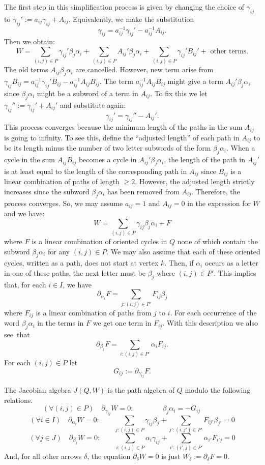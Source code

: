 The first step in this simplification process is given by changing the choice of $\gamma_{ij}$ to $\gamma_{ij}':=a_{ij}\gamma_{ij}+A_{ij}$. Equivalently, we make the substitution 
\[
\gamma_{ij}=a_{ij}^{-1}\gamma_{ij}'-a_{ij}^{-1}A_{ij}.
\]
Then we obtain:
\[
	W=\sum_{(i,j)\in P}\gamma_{ij}'\beta_j\alpha_i+\sum_{(i,j)\in P}A_{ij}'\beta_j\alpha_i+\sum_{(i,j)\in P}\gamma_{ij}'B_{ij}'+ \text{ other terms}.
\]
The old terms $A_{ij}\beta_j\alpha_i$ are cancelled. However, new term arise from $\gamma_{ij}B_{ij}=a_{ij}^{-1}\gamma_{ij}'B_{ij}-a_{ij}^{-1}A_{ij}B_{ij}$. The term $a_{ij}^{-1}A_{ij}B_{ij}$ might give a term $A_{ij}'\beta_j\alpha_i$ since $\beta_j\alpha_i$ might be a subword of a term in $A_{ij}$. To fix this we let $\gamma_{ij}'':=\gamma_{ij}'+A_{ij}'$ and substitute again:
\[
	\gamma_{ij}'=\gamma_{ij}''-A_{ij}'.
\]
This process converges because the minimum length of the paths in the sum $A_{ij}$ is going to infinity. To see this, define the ``adjusted length'' of each path in $A_{ij}$ to be its length minus the number of two letter subwords of the form $\beta_j\alpha_i$. When a cycle in the sum $A_{ij}B_{ij}$ becomes a cycle in $A_{ij}'\beta_j\alpha_i$, the length of the path in $A_{ij}'$ is at least equal to the length of the corresponding path in $A_{ij}$ since $B_{ij}$ is a linear combination of paths of length $\ge2$. However, the adjusted length strictly increases since the subword $\beta_j\alpha_i$ has been removed from $A_{ij}$. Therefore, the process converges. So, we may assume $a_{ij}=1$ and $A_{ij}=0$ in the expression for $W$ and we have:
\[
	W=\sum_{(i,j)\in P}\gamma_{ij}\beta_j\alpha_i+F
\]
where $F$ is a linear combination of oriented cycles in $Q$ none of which contain the subword $\beta_j\alpha_i$ for any $(i,j)\in P$. We may also assume that each of these oriented cycles, written as a path, does not start at vertex $k$. Then, if $\alpha_i$ occurs as a letter in one of these paths, the next letter must be $\beta_{j}$ where $(i,j)\in P'$. This implies that, for each $i\in I$, we have
\[
	\partial_{\alpha_i}F=\sum_{j:(i,j)\in P'} F_{ij}\beta_j
\]
where $F_{ij}$ is a linear combination of paths from $j$ to $i$. For each occurrence of the word $\beta_j\alpha_i$ in the terms in $F$ we get one term in $F_{ij}$. With this description we also see~that
\[
	\partial_{\beta_j}F=\sum_{i:(i,j)\in P'} \alpha_iF_{ij}.
\]
For each $(i,j)\in P$ let
\[
	G_{ij}:=\partial_{\gamma_{ij}}F.
\]


The Jacobian algebra $J(Q,W)$ is the path algebra of $Q$ modulo the following relations.
\[
	(\forall (i,j)\in P)\quad \partial_{\gamma_{ij}}W=0:\qquad\qquad \beta_j\alpha_i=-G_{ij}\qquad\quad 
\]
\begin{equation}\label{partial alpha-i W=0}
	(\forall i\in I)\quad \partial_{\alpha_i}W=0:\qquad \sum_{j:(i,j)\in P} \gamma_{ij}\beta_j+\sum_{j':(i,j')\in P'} F_{ij'}\beta_{j'} =0
\end{equation}
\[
	(\forall j\in J)\quad \partial_{\beta_j}W=0:\qquad \sum_{i: (i,j)\in P} \alpha_i\gamma_{ij}+\sum_{i': (i',j)\in P'} \alpha_{i'}F_{i'j} =0
\]
And, for all other arrows $\delta$, the equation $\partial_\delta W=0$ is just $W_\delta:=\partial_\delta F=0$.


